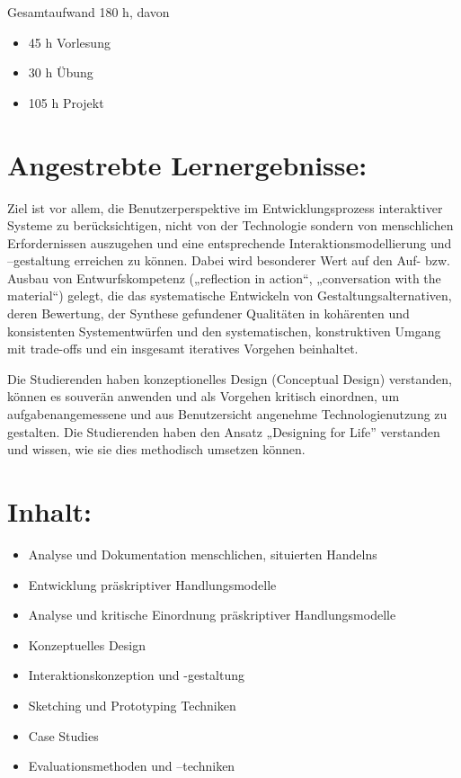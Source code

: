 Gesamtaufwand 180 h, davon

\begin{itemize}
\tightlist
\item
  45 h Vorlesung
\item
  30 h Übung
\item
  105 h Projekt
\end{itemize}

\section*{Angestrebte
Lernergebnisse:}\label{angestrebte-lernergebnisse-5}

Ziel ist vor allem, die Benutzerperspektive im Entwicklungsprozess
interaktiver Systeme zu berücksichtigen, nicht von der Technologie
sondern von menschlichen Erfordernissen auszugehen und eine
entsprechende Interaktionsmodellierung und --gestaltung erreichen zu
können. Dabei wird besonderer Wert auf den Auf- bzw. Ausbau von
Entwurfskompetenz („reflection in action``, „conversation with the
material``) gelegt, die das systematische Entwickeln von
Gestaltungsalternativen, deren Bewertung, der Synthese gefundener
Qualitäten in kohärenten und konsistenten Systementwürfen und den
systematischen, konstruktiven Umgang mit trade-offs und ein insgesamt
iteratives Vorgehen beinhaltet.

Die Studierenden haben konzeptionelles Design (Conceptual Design)
verstanden, können es souverän anwenden und als Vorgehen kritisch
einordnen, um aufgabenangemessene und aus Benutzersicht angenehme
Technologienutzung zu gestalten. Die Studierenden haben den Ansatz
„Designing for Life'' verstanden und wissen, wie sie dies methodisch
umsetzen können.

\section*{Inhalt:}\label{inhalt-5}

\begin{itemize}
\tightlist
\item
  Analyse und Dokumentation menschlichen, situierten Handelns
\item
  Entwicklung präskriptiver Handlungsmodelle
\item
  Analyse und kritische Einordnung präskriptiver Handlungsmodelle
\item
  Konzeptuelles Design
\item
  Interaktionskonzeption und -gestaltung
\item
  Sketching und Prototyping Techniken
\item
  Case Studies
\item
  Evaluationsmethoden und --techniken
\end{itemize}

